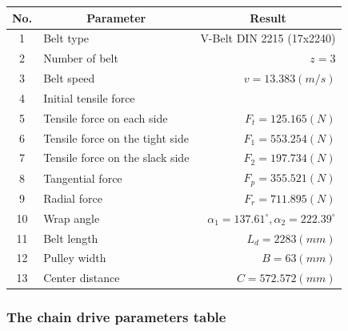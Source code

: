 \begin{table}[h!t]
	\centering
	\renewcommand{\arraystretch}{1.5}
	\begin{tabular}{clr}
		\toprule
		No. & \multicolumn{1}{c}{Parameter} & \multicolumn{1}{c}{Result}\\
		\midrule
		1 & Belt type & V-Belt DIN 2215 (17x2240)\\
		2 & Number of belt & $ z=3 $\\
		3 & Belt speed & $ v=13.383\unit{(m/s)} $\\
		4 & Initial tensile force & \\
		5 & Tensile force on each side & $ F_t=125.165\unit{(N)} $\\
		6 & Tensile force on the tight side & $ F_1=553.254\unit{(N)} $\\
		7 & Tensile force on the slack side & $ F_2=197.734\unit{(N)} $\\
		8 & Tangential force & $ F_p=355.521\unit{(N)} $\\
		9 & Radial force  & $ F_r =711.895\unit{(N)}$\\
		10 & Wrap angle & $ \alpha_1 = 137.61^\circ, \alpha_2= 222.39^\circ $\\
		11 & Belt length & $ L_d=2283\unit{(mm)} $\\
		12 & Pulley width & $ B=63\unit{(mm)} $\\
		13 & Center distance & $ C=572.572\unit{(mm)} $\\
		\bottomrule
	\end{tabular}
\end{table}
\subsubsection{The chain drive parameters table}

